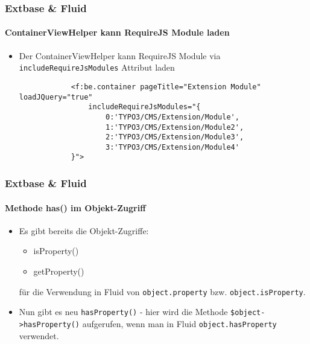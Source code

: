 
\begin{frame}[fragile]
	\frametitle{Extbase \& Fluid}
	\framesubtitle{ContainerViewHelper kann RequireJS Module laden}

	\lstset{
		basicstyle=\tiny\ttfamily
	}

	\begin{itemize}
		\item Der ContainerViewHelper kann RequireJS Module via \texttt{includeRequireJsModules} Attribut laden

		\begin{lstlisting}
			<f:be.container pageTitle="Extension Module" loadJQuery="true"
				includeRequireJsModules="{
					0:'TYPO3/CMS/Extension/Module',
					1:'TYPO3/CMS/Extension/Module2',
					2:'TYPO3/CMS/Extension/Module3',
					3:'TYPO3/CMS/Extension/Module4'
			}">
		\end{lstlisting}

	\end{itemize}

\end{frame}


\begin{frame}[fragile]
	\frametitle{Extbase \& Fluid}
	\framesubtitle{Methode has() im Objekt-Zugriff}

	\lstset{
		basicstyle=\tiny\ttfamily
	}

	\begin{itemize}

		\item Es gibt bereits die Objekt-Zugriffe:
		\begin{itemize}
			\item isProperty()
			\item getProperty()
		\end{itemize}
		für die Verwendung in Fluid von \texttt{object.property} bzw. \texttt{object.isProperty}.

		\item Nun gibt es neu \texttt{hasProperty()} - hier wird die Methode \texttt{\$object->hasProperty()} aufgerufen, wenn man in Fluid \texttt{object.hasProperty} verwendet.
	\end{itemize}

\end{frame}

